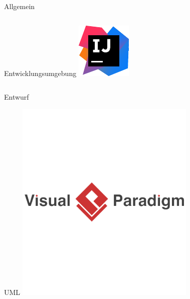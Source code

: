\documentclass[xcolor=dvipsnames]{beamer}
\begin{document}
\begin{frame}{Allgemein}
\begin{columns}
\begin{column}{0.5\textwidth}
\begin{block}{Entwicklungsumgebung}
                    \includegraphics[width=\textwidth]{img/intellij.pdf}
                \end{block}
            \end{column}
        \end{columns}
    \end{frame}
    \begin{frame}{Entwurf}
        \begin{block}{UML}
            \center
            \includegraphics[width=(\textwidth / 2)]{img/vispar.png} %
        \end{block}
    \end{frame}
\end{document}

